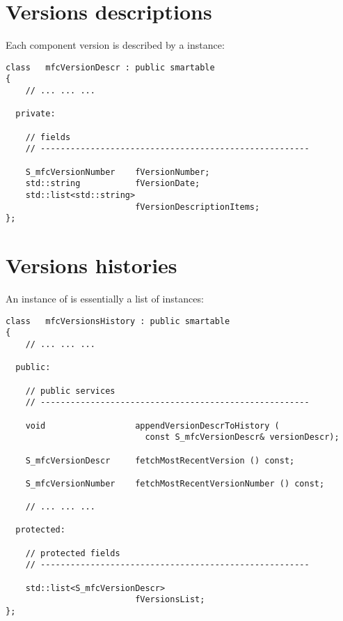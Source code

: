 \section{Versions descriptions}\label{Versions descriptions}

Each component version is described by a  instance:
\begin{lstlisting}[language=CPlusPlus]
class   mfcVersionDescr : public smartable
{
	// ... ... ...

  private:

    // fields
    // ------------------------------------------------------

    S_mfcVersionNumber    fVersionNumber;
    std::string           fVersionDate;
    std::list<std::string>
                          fVersionDescriptionItems;
};
\end{lstlisting}


\section{Versions histories}\label{Versions histories}

An instance of  is essentially a list of  instances:
\begin{lstlisting}[language=CPlusPlus]
class   mfcVersionsHistory : public smartable
{
	// ... ... ...

  public:

    // public services
    // ------------------------------------------------------

    void                  appendVersionDescrToHistory (
                            const S_mfcVersionDescr& versionDescr);

    S_mfcVersionDescr     fetchMostRecentVersion () const;

    S_mfcVersionNumber    fetchMostRecentVersionNumber () const;

	// ... ... ...

  protected:

    // protected fields
    // ------------------------------------------------------

    std::list<S_mfcVersionDescr>
                          fVersionsList;
};
\end{lstlisting}

